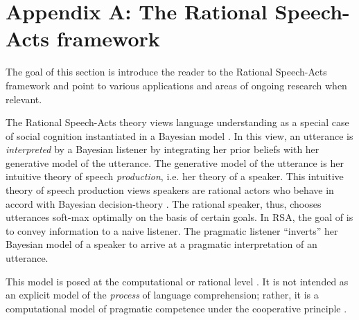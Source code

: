 \documentclass[12pt,letterpaper]{article}
\begin{document}
\newpage


\setlength{\bibleftmargin}{.125in}
\setlength{\bibindent}{-\bibleftmargin}



\newpage


\section*{Appendix A: The Rational Speech-Acts framework}

The goal of this section is introduce the reader to the Rational Speech-Acts framework and point to various applications and areas of ongoing research when relevant.

The Rational Speech-Acts theory views language understanding as a special case of social cognition instantiated in a Bayesian model \cite{Frank2012, Goodman2013}. 
In this view, an utterance is \emph{interpreted} by a Bayesian listener by integrating her prior beliefs with her generative model of the utterance.
The generative model of the utterance is her intuitive theory of speech \emph{production}, i.e. her theory of a speaker. 
This intuitive theory of speech production views speakers are rational actors who behave in accord with Bayesian decision-theory \cite{Berger1985}.
The rational speaker, thus, chooses utterances soft-max optimally on the basis of certain goals.
In RSA, the goal of is to convey information to a naive listener. 
The pragmatic listener ``inverts'' her Bayesian model of a speaker to arrive at a pragmatic interpretation of an utterance.

This model is posed at the computational or rational level \cite{Marr1980, Anderson1991}. 
It is not intended as an explicit model of the \emph{process} of language comprehension; rather, it is a computational model of pragmatic competence under the cooperative principle \cite{Grice1975}. 
\end{document}
